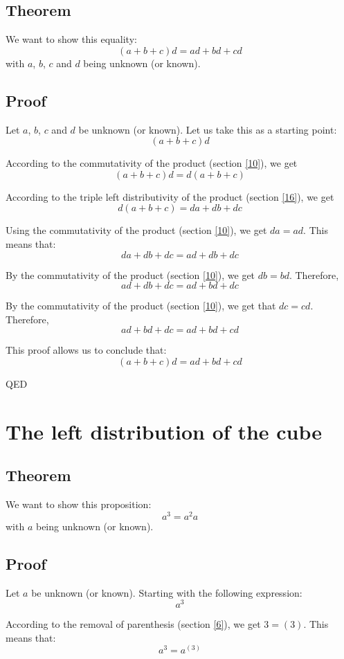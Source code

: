 \documentclass[a4paper]{article}
\begin{document}
\subsection{Theorem}
We want to show this equality:
\[\left(a + b + c\right)d = ad + bd + cd\]
with $a$, $b$, $c$ and $d$ being unknown (or known).\subsection{Proof}
Let $a$, $b$, $c$ and $d$ be unknown (or known). Let us take this as a starting point:
\[\left(a+b+c\right)d\]

According to the commutativity of the product (section \ref{10}), we get
\[\left(a+b+c\right)d=d\left(a+b+c\right)\]

According to the triple left distributivity of the product (section \ref{16}), we get
\[d\left(a+b+c\right)=da+db+dc\]

Using the commutativity of the product (section \ref{10}), we get $da=ad$. This means that:
\[da+db+dc=ad+db+dc\]

By the commutativity of the product (section \ref{10}), we get $db=bd$. Therefore,
\[ad+db+dc=ad+bd+dc\]

By the commutativity of the product (section \ref{10}), we get that $dc=cd$. Therefore,
\[ad+bd+dc=ad+bd+cd\]

This proof allows us to conclude that:
\[\left(a+b+c\right)d = ad+bd+cd\]
\begin{flushright}
QED
\end{flushright}



\section{The left distribution of the cube\label{18}}
\subsection{Theorem}
We want to show this proposition:
\[a^3 = a^2a\]
with $a$ being unknown (or known).\subsection{Proof}
Let $a$ be unknown (or known). Starting with the following expression:
\[a^3\]

According to the removal of parenthesis (section \ref{6}), we get $3=\left(3\right)$. This means that:
\[a^3=a^{\left(3\right)}\]
\end{document}
